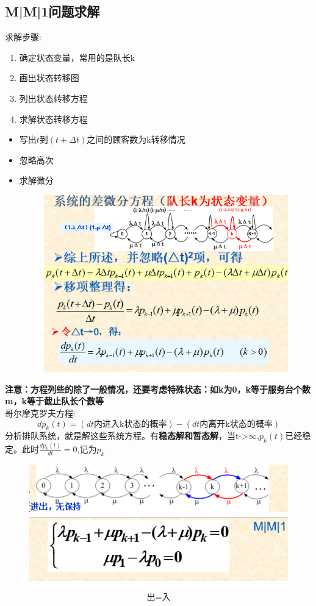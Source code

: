 \subsection{M|M|1问题求解}
求解步骤:
\begin{enumerate}
	\item 确定状态变量，常用的是队长k
	\item 画出状态转移图
	\item 列出状态转移方程
	\item 求解状态转移方程
\end{enumerate}
\begin{itemize}
	\item 写出$ t $到$ (t+\Delta t) $之间的顾客数为k转移情况
	\item 忽略高次
	\item 求解微分
	\begin{figure}
		\centering
		\includegraphics[width=0.7\linewidth]{figures/screenshot025}
		\caption{}
		\label{fig:screenshot025}
	\end{figure}
\end{itemize}
\textbf{注意：方程列些的除了一般情况，还要考虑特殊状态：如k为0，k等于服务台个数m，k等于截止队长个数等}\\
哥尔摩克罗夫方程:
\begin{equation}\label{key}
dp_k(t)=(dt\text{内进入k状态的概率})-(dt\text{内离开k状态的概率})
\end{equation}
分析排队系统，就是解这些系统方程。有\textbf{稳态解和暂态解}，当t->$ \infty $,$ p_k(t) $已经稳定。此时$ \frac{dp_k(t)}{dt} =0$,记为$ p_k $
\begin{figure}
	\centering
	\includegraphics[width=0.7\linewidth]{figures/screenshot027}
	\includegraphics[width=0.7\linewidth]{figures/screenshot028}
	\caption{}
	\label{fig:screenshot027}
\end{figure}
\begin{equation}\label{key}
\text{出} = \text{入}
\end{equation}
